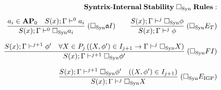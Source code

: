 \documentclass[preview]{standalone}
\begin{document}
\begin{align*}
\special{dvisvgm:raw <g id='unique000'>}\mathbf{Syntrix\text{-}Internal\;Stability\;\Box_{\text{Syn}}\;Rules:}\\[4pt]\frac{a_i\in\mathbf{AP}_0 \quad S(x);\Gamma\vdash^0 a_i}{S(x);\Gamma\vdash^0 \Box_{\text{Syn}}a_i}\;(\Box_{\text{Syn}}\mathfrak{a}I)\qquad \frac{S(x);\Gamma\vdash^j \Box_{\text{Syn}}\phi}{S(x);\Gamma\vdash^j \phi}\;(\Box_{\text{Syn}}E_T)\\[7pt]\frac{S(x);\Gamma\vdash^{j+1}\phi' \quad \forall X\in P_j\,((X,\phi')\in I_{j+1}\to\Gamma\vdash^j\Box_{\text{Syn}}X)}{S(x);\Gamma\vdash^{j+1}\Box_{\text{Syn}}\phi'}\;(\Box_{\text{Syn}}FI)\\[7pt]\frac{S(x);\Gamma\vdash^{j+1}\Box_{\text{Syn}}\phi' \quad ((X,\phi')\in I_{j+1})}{S(x);\Gamma\vdash^j\Box_{\text{Syn}}X}\;(\Box_{\text{Syn}}E_{\text{IGP}})\special{dvisvgm:raw </g>}
\end{align*}
\end{document}
